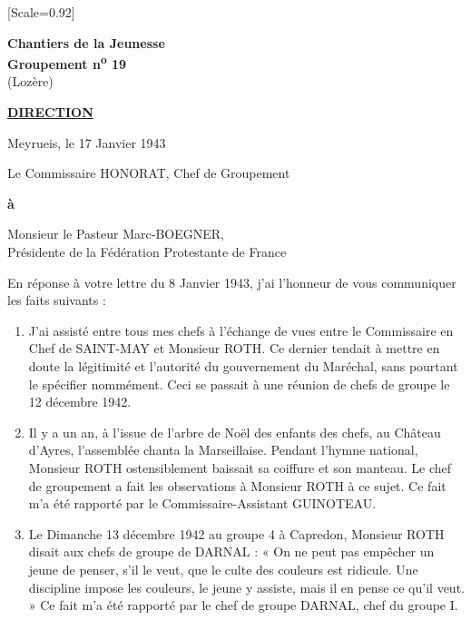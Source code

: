 \newpage
\papierquadrille
{[Scale=0.92]
\small

\thispagestyle{empty}

\begin{center}
\textbf{\large Chantiers de la Jeunesse}\\
\textbf{Groupement n\textsuperscript{o} 19}\\
(Lozère)
\end{center}

\noindent\textbf{\underline{DIRECTION}}

\begin{flushright}
Meyrueis, le 17 Janvier 1943
\end{flushright}

\noindent
Le Commissaire HONORAT, Chef de Groupement

\vspace{1em}

\noindent
\textbf{à}

\begin{center}
Monsieur le Pasteur Marc-BOEGNER,\\
Présidente de la Fédération Protestante de France
\end{center}

\vspace{1em}

En réponse à votre lettre du 8 Janvier 1943, j’ai l’honneur
de vous communiquer les faits suivants :

\begin{enumerate}
\item
J’ai assisté entre tous mes chefs à l’échange de vues
entre le Commissaire en Chef de SAINT-MAY et Monsieur ROTH. Ce dernier
tendait à mettre en doute la légitimité et l’autorité du gouvernement
du Maréchal, sans pourtant le spécifier nommément. Ceci se
passait à une réunion de chefs de groupe le 12 décembre 1942.

\item
Il y a un an, à l’issue de l’arbre de Noël des enfants
des chefs, au Château d’Ayres, l’assemblée chanta la Marseillaise.
Pendant l’hymne national, Monsieur ROTH ostensiblement baissait sa
coiffure et son manteau. Le chef de groupement a fait les observations
à Monsieur ROTH à ce sujet. Ce fait m’a été rapporté par le Commissaire-Assistant GUINOTEAU.

\item
Le Dimanche 13 décembre 1942 au groupe 4 à Capredon,
Monsieur ROTH disait aux chefs de groupe de DARNAL : « On ne
peut pas empêcher un jeune de penser, s’il le veut, que le culte
des couleurs est ridicule. Une discipline impose les couleurs, le
jeune y assiste, mais il en pense ce qu’il veut. » Ce fait m’a été
rapporté par le chef de groupe DARNAL, chef du groupe I.


\end{enumerate}}
